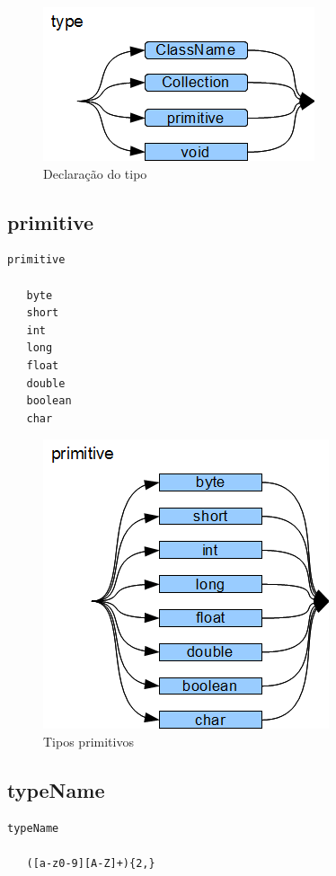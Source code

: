 \begin{figure}[h!]
 \centering
 \includegraphics{capitulo09/type.png}
 \caption{Declaração do tipo}
\end{figure}
\subsection{primitive}

\begin{lstlisting}
primitive

   byte
   short
   int
   long
   float
   double
   boolean
   char

\end{lstlisting}

\begin{figure}[h!]
 \centering
 \includegraphics[scale=0.8]{capitulo09/primitive.png}
 \caption{Tipos primitivos}
\end{figure}
\subsection{typeName}

\begin{lstlisting}
typeName

   ([a-z0-9][A-Z]+){2,}

\end{lstlisting}

